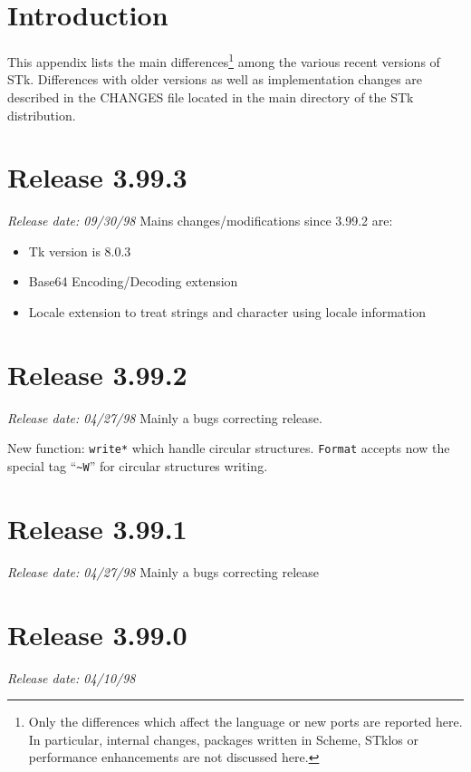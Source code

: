%
%
%

\section*{Introduction}

This appendix lists the main differences\footnote{ Only the
  differences which affect the language or new ports are reported
  here.  In particular, internal changes, packages written in Scheme,
  STklos or performance enhancements are not discussed here.} among
the various recent versions of STk.  Differences with older versions
as well as implementation changes are described in the CHANGES file
located in the main directory of the STk distribution.

\section*{Release 3.99.3}
\small{\emph{Release date: 09/30/98}}
Mains changes/modifications since 3.99.2 are:
\begin{itemize}
\item  Tk version is 8.0.3
  
\item Base64 Encoding/Decoding extension
  
\item Locale extension to treat strings and character using locale
  information
\end{itemize}

\section*{Release 3.99.2}
\small{\emph{Release date: 04/27/98}}
Mainly a bugs correcting release.

New function: \texttt{write*} which handle circular structures. \texttt{Format}
accepts now the special tag ``\verb+~W+'' for circular structures writing.

\section*{Release 3.99.1}
\small{\emph{Release date: 04/27/98}}
Mainly a bugs correcting release

\section*{Release 3.99.0}
\small{\emph{Release date: 04/10/98}}

